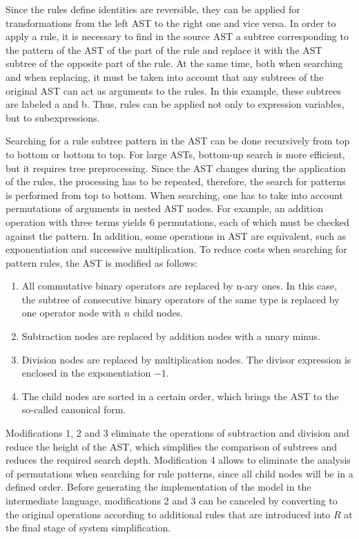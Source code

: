 \documentclass[lettersize,journal]{IEEEtran}
\begin{document}
Since the rules define identities are reversible, they can be applied for transformations from the left AST to the right one and vice versa. 
In order to apply a rule, it is necessary to find in the source AST a subtree corresponding to the pattern of the AST of the part of the rule and replace it
with the AST subtree of the opposite part of the rule. At the same time, both when searching and when replacing, it must be taken into account that any subtrees 
of the original AST can act as arguments to the rules. In this example, these subtrees are labeled a and b. Thus, rules can be applied not only to 
expression variables, but to subexpressions.

Searching for a rule subtree pattern in the AST can be done recursively from top to bottom or bottom to top. For large ASTs, bottom-up search is more efficient, 
but it requires tree preprocessing. Since the AST changes during the application of the rules, the processing has to be repeated, therefore, 
the search for patterns is performed from top to bottom. When searching, one has to take into account permutations of arguments in nested 
AST nodes. For example, an addition operation with three terms yields 6 permutations, each of which must be checked against the pattern. 
In addition, some operations in AST are equivalent, such as exponentiation and successive multiplication. 
To reduce costs when searching for pattern rules, the AST is modified as follows:

\begin{enumerate}
	\item All commutative binary operators are replaced by n-ary ones. In this case, the subtree of consecutive binary operators of the same type is replaced by one operator node with \(n\) child nodes.
	\item Subtraction nodes are replaced by addition nodes with a unary minus.
	\item Division nodes are replaced by multiplication nodes. The divisor expression is enclosed in the exponentiation \(-1\).
	\item The child nodes are sorted in a certain order, which brings the AST to the so-called canonical form.
\end{enumerate}

Modifications 1, 2 and 3 eliminate the operations of subtraction and division and reduce the height of the AST, which simplifies the comparison of subtrees 
and reduces the required search depth. Modification 4 allows to eliminate the analysis of permutations when searching for rule patterns, since all child 
nodes will be in a defined order. Before generating the implementation of the model in the intermediate language, modifications 2 and 3 can be canceled by
converting to the original operations according to additional rules that are introduced into \(R\) at the final stage of system simplification.
\end{document}
